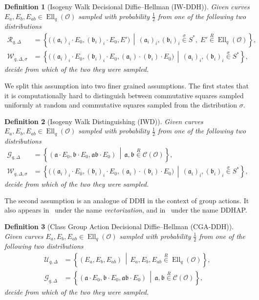 \documentclass{article}
\newcommand{\Cl}{\mathcal{C}}
\renewcommand{\O}{\mathcal{O}}
\newcommand{\suchthat}{\,\middle\vert\,}
\renewcommand{\frak}{\mathfrak}
\newcommand{\rand}[1]{\overset{#1}{∈}}
\newcommand{\uni}{\rand{R}}
\newtheorem{definition}{Definition}[section]
\theoremstyle{definition}
\DeclareMathOperator{\Ell}{Ell}
\begin{document}
\begin{definition}[Isogeny Walk Decisional Diffie--Hellman (IW-DDH)]
  Given curves $E_a,E_b,E_{ab}∈\Ell_q(\O)$ sampled with probability
  $\frac{1}{2}$ from one of the following two distributions
  \begin{align*}
    \mathcal{R}_{q,Δ} &= \left\{\bigl((\frak a_i)_i·E_0,(\frak b_i)_i·E_0,E'\bigr) \suchthat
                        (\frak a_i)_i,(\frak b_i)_i\rand{σ}S^*,\;
                        E'\uni\Ell_q(\O)\right\},\\
    \mathcal{W}_{q,Δ,σ} &= \left\{\bigl((\frak a_i)_i·E_0,(\frak b_i)_i·E_0,(\frak a_i)·(\frak b_i)·E_0\bigr) \suchthat
                          (\frak a_i)_i,(\frak b_i)_i\rand{σ}S^*\right\},
  \end{align*}
  decide from which of the two they were sampled.
\end{definition}

We split this assumption into two finer grained assumptions. The first
states that it is computationally hard to distinguish between
commutative squares sampled uniformly at random and commutative
squares sampled from the distribution $σ$.

\begin{definition}[Isogeny Walk Distinguishing (IWD)]
  Given curves $E_a,E_b,E_{ab}∈\Ell_q(\O)$ sampled with probability
  $\frac{1}{2}$ from one of the following two distributions
  \begin{align*}
    \mathcal{G}_{q,Δ} &= \left\{(\frak a·E_0,\frak b·E_0,\frak{ab}·E_0) \suchthat
                        \frak a,\frak b\uni\Cl(\O)\right\},\\
    \mathcal{W}_{q,Δ,σ} &= \left\{\bigl((\frak a_i)_i·E_0,(\frak b_i)_i·E_0,(\frak a_i)·(\frak b_i)·E_0\bigr) \suchthat
                          (\frak a_i)_i,(\frak b_i)_i\rand{σ}S^*\right\},
  \end{align*}
  decide from which of the two they were sampled.
\end{definition}

The second assumption is an analogue of DDH in the context of group
actions. It also appears in~\cite{cryptoeprint:2006:291} under the
name \emph{vectorization}, and in~\cite{Stol,Stolbunov2012} under the
name DDHAP.
 
\begin{definition}[Class Group Action Decisional Diffie--Hellman (CGA-DDH)]
  Given curves $E_a,E_b,E_{ab}∈\Ell_q(\O)$ sampled with probability
  $\frac{1}{2}$ from one of the following two distributions
  \begin{align*}
    \mathcal{U}_{q,Δ} &= \left\{(E_a,E_b,E_{ab}) \suchthat E_a,E_b,E_{ab}\uni\Ell_q(\O)\right\},\\
    \mathcal{G}_{q,Δ} &= \left\{(\frak a·E_0,\frak b·E_0,\frak{ab}·E_0) \suchthat
                        \frak a,\frak b\uni\Cl(\O)\right\},
  \end{align*}
  decide from which of the two they were sampled.
\end{definition}
\end{document}
